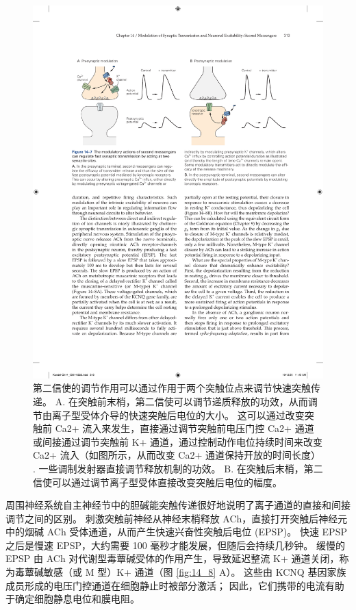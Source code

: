 \begin{figure}[htbp]
	\centering
	\includegraphics[width=0.9\linewidth]{chap14/fig_14_7}
	\caption{第二信使的调节作用可以通过作用于两个突触位点来调节快速突触传递。 A. 在突触前末梢，第二信使可以调节递质释放的功效，从而调节由离子型受体介导的快速突触后电位的大小。 这可以通过改变突触前 Ca2+ 流入来发生，直接通过调节突触前电压门控 Ca2+ 通道或间接通过调节突触前 K+ 通道，通过控制动作电位持续时间来改变 Ca2+ 流入（如图所示，从而改变 Ca2+ 通道保持开放的时间长度） . 一些调制发射器直接调节释放机制的功效。 B. 在突触后末梢，第二信使可以通过调节离子型受体直接改变突触后电位的幅度。}
	\label{fig:14_7}
\end{figure}


周围神经系统自主神经节中的胆碱能突触传递很好地说明了离子通道的直接和间接调节之间的区别。
刺激突触前神经从神经末梢释放 ACh，直接打开突触后神经元中的烟碱 ACh 受体通道，从而产生快速兴奋性突触后电位 (EPSP)。 
快速 EPSP 之后是慢速 EPSP，大约需要 100 毫秒才能发展，但随后会持续几秒钟。 
缓慢的 EPSP 由 ACh 对代谢型毒蕈碱受体的作用产生，导致延迟整流 K+ 通道关闭，称为毒蕈碱敏感（或 M 型）K+ 通道（图 \ref{fig:14_8} A）。 
这些由 KCNQ 基因家族成员形成的电压门控通道在细胞静止时被部分激活； 
因此，它们携带的电流有助于确定细胞静息电位和膜电阻。

